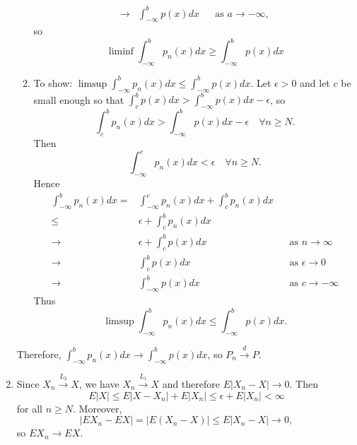 \documentclass{article}
\newcommand{\dto}{\overset{d}{\to}}
\begin{document}
\begin{enumerate}
\begin{enumerate}
\begin{align*}
      \\ \to & \int_{-\infty}^b p(x) dx && \text{as } a \to -\infty,
    \end{align*}
    so 
    \[
      \liminf \int_{-\infty}^b p_n(x) dx \geq \int_{-\infty}^b p(x) dx
    \]
  \item To show: $\limsup \int_{-\infty}^b p_n(x) dx \leq \int_{-\infty}^b p(x) dx$.
    Let $\epsilon >0$ and let $c$ be small enough so that $\int_{c}^b p(x) dx > \int_{-\infty}^b p(x) dx - \epsilon$,
    so
    \[
      \int_{c}^b p_n(x) dx > \int_{-\infty}^b p(x) dx - \epsilon \quad \forall n \geq N.
    \]
    Then 
    \[
      \int_{-\infty}^c p_n(x) dx < \epsilon \quad \forall n \geq N.
    \]
    Hence
    \begin{align*}
      \int_{-\infty}^b p_n(x) dx 
      = & \int_{-\infty}^c p_n(x) dx 
      + \int_{c}^b p_n(x) dx 
      \\ \leq & \epsilon + \int_{c}^b p_n(x) dx 
      \\ \to & \epsilon + \int_{c}^b p(x) dx && \text{as } n \to \infty
      \\ \to & \int_{c}^b p(x) dx && \text{as } \epsilon \to 0
      \\ \to & \int_{-\infty}^b p(x) dx && \text{as } c \to -\infty
    \end{align*}
    Thus
    \[
      \limsup \int_{-\infty}^b p_n(x) dx \leq \int_{-\infty}^b p(x) dx.
    \]
  \end{enumerate}
  Therefore, $\int_{-\infty}^b p_n(x) dx \to \int_{-\infty}^b p(x) dx$,
  so $P_n \dto P$.
  \item Since $X_n \overset{L_2}{\to} X$, we have $X_n \overset{L_1}{\to} X$ and therefore $E|X_n - X| \to 0$.
    Then
    \[
      E|X| \leq E|X - X_n| + E|X_n| \leq \epsilon + E|X_n| < \infty
    \]
    for all $n \geq N$.
    Moreover,
    \[
      |EX_n - EX| = |E(X_n - X)| \leq E|X_n - X| \to 0,
    \]
    so $EX_n \to EX$.
\end{enumerate}
\end{document}
